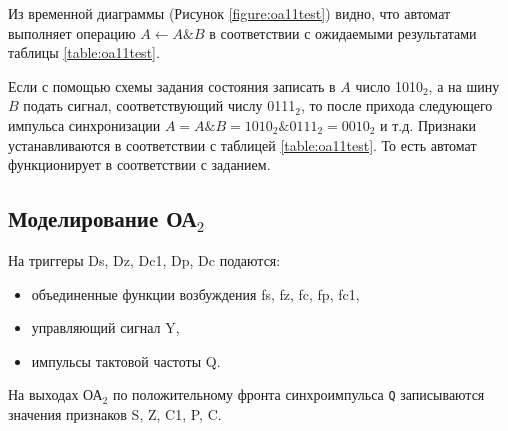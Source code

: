 Из временной диаграммы (Рисунок \ref{figure:oa11test}) видно, что автомат выполняет операцию $A \leftarrow A \& B$ в соответствии с ожидаемыми результатами таблицы \ref{table:oa11test}. 

Если с помощью схемы задания состояния записать в $A$ число 1010$_2$, а на шину $B$ подать сигнал, соответствующий числу 0111$_2$, то после прихода следующего импульса синхронизации $A = A \& B = 1010_2 \& 0111_2 = 0010_2$ и т.д. Признаки устанавливаются в соответствии с таблицей \ref{table:oa11test}. То есть автомат функционирует в соответствии с заданием.

\clearpage
\subsection{Моделирование ОА$_2$}

На триггеры Ds, Dz, Dc1, Dp, Dc подаются:
\begin{itemize}
	\item объединенные функции возбуждения fs, fz, fc, fp, fc1,
	\item управляющий сигнал Y,
	\item импульсы тактовой частоты Q.
\end{itemize} 

На выходах ОА$_2$ по положительному фронта синхроимпульса \texttt{Q} записываются значения признаков S, Z, C1, P, C.


